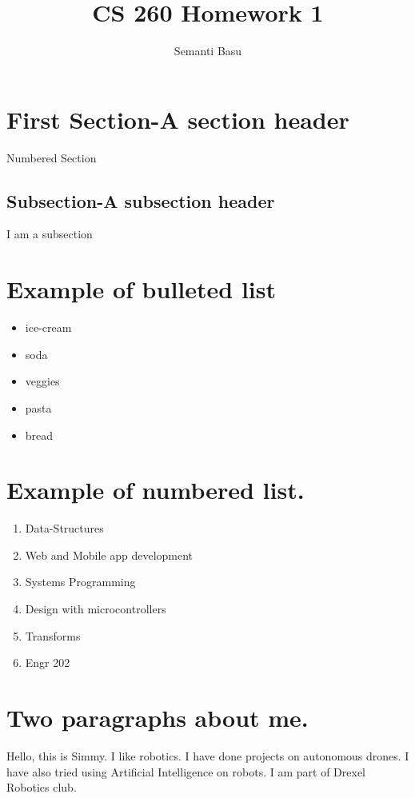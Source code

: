 \documentclass{article}
\begin{document}
\title {CS 260 Homework 1}
\author{Semanti Basu}
\maketitle
\section{First Section-A section header}
Numbered Section 
\subsection{Subsection-A subsection header}
I am a subsection

\section*{Example of bulleted list}


\begin{itemize}
\item ice-cream
\item soda
\item veggies
\item pasta
\item bread
\end{itemize}



\section*{Example of numbered list.}




\begin{enumerate}
\item Data-Structures
\item Web and Mobile app development
\item Systems Programming
\item Design with microcontrollers
\item Transforms
\item Engr 202
\end{enumerate}



\section*{Two paragraphs about me.}




Hello, this is Simmy. I like robotics. I have done projects on autonomous drones. I have also tried using Artificial Intelligence on robots. I am part of Drexel Robotics club.
\end{document}
